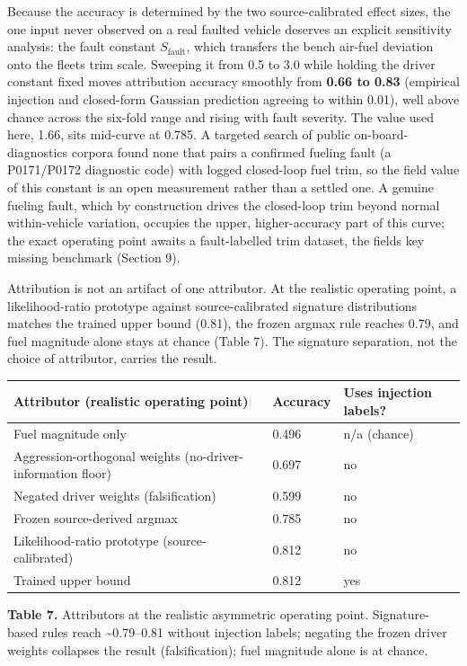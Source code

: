 Because the accuracy is determined by the two source-calibrated effect
sizes, the one input never observed on a real faulted vehicle deserves
an explicit sensitivity analysis: the fault constant
\(S_{\text{fault}}\), which transfers the bench air-fuel deviation onto
the fleet\textquotesingle s trim scale. Sweeping it from 0.5 to 3.0
while holding the driver constant fixed moves attribution accuracy
smoothly from \textbf{0.66 to 0.83} (empirical injection and closed-form
Gaussian prediction agreeing to within 0.01), well above chance across
the six-fold range and rising with fault severity. The value used here,
1.66, sits mid-curve at 0.785. A targeted search of public
on-board-diagnostics corpora found none that pairs a confirmed fueling
fault (a P0171/P0172 diagnostic code) with logged closed-loop fuel trim,
so the field value of this constant is an open measurement rather than a
settled one. A genuine fueling fault, which by construction drives the
closed-loop trim beyond normal within-vehicle variation, occupies the
upper, higher-accuracy part of this curve; the exact operating point
awaits a fault-labelled trim dataset, the field\textquotesingle s key
missing benchmark (Section 9).

Attribution is not an artifact of one attributor. At the realistic
operating point, a likelihood-ratio prototype against source-calibrated
signature distributions matches the trained upper bound (0.81), the
frozen argmax rule reaches 0.79, and fuel magnitude alone stays at
chance (Table 7). The signature separation, not the choice of
attributor, carries the result.

\begin{longtable}[]{@{}lll@{}}
\toprule\noalign{}
Attributor (realistic operating point) & Accuracy & Uses injection
labels? \\
\midrule\noalign{}
\endhead
\bottomrule\noalign{}
\endlastfoot
Fuel magnitude only & 0.496 & n/a (chance) \\
Aggression-orthogonal weights (no-driver-information floor) & 0.697 &
no \\
Negated driver weights (falsification) & 0.599 & no \\
Frozen source-derived argmax & 0.785 & no \\
Likelihood-ratio prototype (source-calibrated) & 0.812 & no \\
Trained upper bound & 0.812 & yes \\
\end{longtable}

\textbf{Table 7.} Attributors at the realistic asymmetric operating
point. Signature-based rules reach \textasciitilde0.79--0.81 without
injection labels; negating the frozen driver weights collapses the
result (falsification); fuel magnitude alone is at chance.

